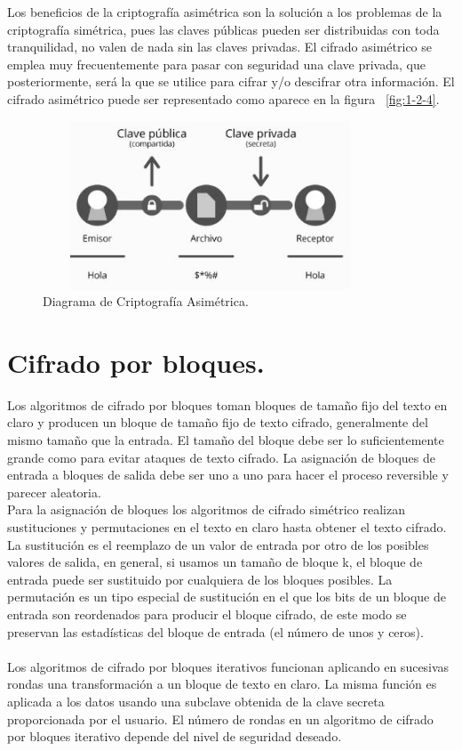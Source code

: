  Los beneficios de la criptografía asimétrica son la solución a los problemas de la criptografía simétrica, pues las claves públicas pueden ser distribuidas con toda tranquilidad, no valen de nada sin las claves privadas. El cifrado asimétrico se emplea muy frecuentemente para pasar con seguridad una clave privada, que posteriormente, será la que se utilice para cifrar y/o descifrar otra información. El cifrado asimétrico puede ser representado como aparece en la figura ~\ref{fig:1-2-4}.

\begin{figure}[H]
\centering
	\includegraphics[width=10cm, height=5cm]{./images/Cripto_Asimetrica.jpg}
	\caption{Diagrama de Criptografía Asimétrica.}
	\label{fig:2-3-2}
\end{figure}

\section{Cifrado por bloques. }
Los algoritmos de cifrado por bloques toman bloques de tamaño fijo del texto en claro y producen un bloque de tamaño fijo de texto cifrado, generalmente del mismo tamaño que la entrada. El tamaño del bloque debe ser lo suficientemente grande como para evitar ataques de texto cifrado. La asignación de bloques de entrada a bloques de salida debe ser uno a uno para hacer el proceso reversible y parecer aleatoria.\\ 
Para la asignación de bloques los algoritmos de cifrado simétrico realizan sustituciones y permutaciones en el texto en claro hasta obtener el texto cifrado.\\ 
La sustitución es el reemplazo de un valor de entrada por otro de los posibles valores de salida, en general, si usamos un tamaño de bloque k, el bloque de entrada puede ser sustituido por cualquiera de los bloques posibles.
La permutación es un tipo especial de sustitución en el que los bits de un bloque de entrada son reordenados para producir el bloque cifrado, de este modo se preservan las estadísticas del bloque de entrada (el número de unos y ceros). \\ \\  Los algoritmos de cifrado por bloques iterativos funcionan aplicando en sucesivas rondas una transformación a un bloque de texto en claro. La misma función es aplicada a los datos usando una subclave obtenida de la clave secreta proporcionada por el usuario. El número de rondas en un algoritmo de cifrado por bloques iterativo depende del nivel de seguridad deseado.

